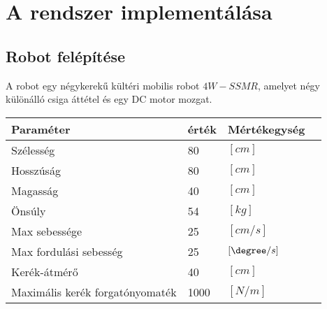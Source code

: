 \chapter{A rendszer implementálása}

\section{Robot felépítése}
A robot egy négykerekű kültéri mobilis robot $4W-SSMR$, amelyet négy különálló csiga áttétel  és egy DC motor mozgat.

\begin{table}[H]
\center
    \begin{tabular}{llll}
        \hline
        Paraméter               & érték     & Mértékegység     \\ \hline
        Szélesség               & 80        &   $[cm]$         \\
        Hosszúság               & 80        &   $[cm]$         \\
        Magasság                & 40        &   $[cm]$         \\
        Önsúly                  & 54        &   $[kg]$         \\
        Max sebessége           & 25        &   $[cm/s]$       \\
        Max fordulási sebesség  &25         &   $[\degree/s]$  \\
        Kerék-átmérő            &40         &   $[cm]$       \\
        Maximális 
        kerék forgatónyomaték   &1000       &   $[N/m]$        \\ 
    \end{tabular}
\end{table}


